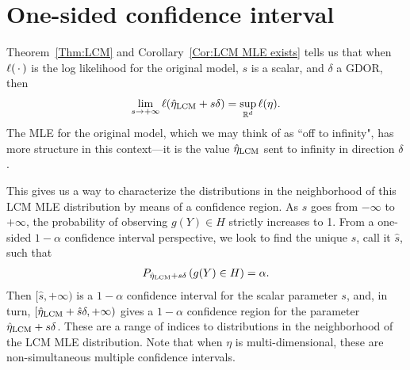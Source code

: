 \section{One-sided confidence interval} \label{S:CI}
Theorem~\ref{Thm:LCM} and Corollary~\ref{Cor:LCM MLE exists} 
tells us that when $\ell(\,\cdot\,)$ is the log likelihood for the original model,
$s$ is a scalar, and $\delta$ a GDOR, then
\begin{align*}
	\lim_{s \to +\infty} \ell(\hat{\eta}_{\textrm{LCM}} + s\delta) = \sup_{{\mathbb R}^d} \ell(\eta).
\end{align*}
The MLE for the original model, which we may think of as ``off to infinity", has
more structure in this context---it is the value $\hat{\eta}_{\textrm{LCM}}$ sent to 
infinity in direction $\delta$.

This gives us a way to characterize the distributions in the
neighborhood of this LCM MLE distribution by means of a confidence region.
As $s$ goes from $-\infty$ to $+\infty$, the probability of observing 
$g(Y) \in H$ strictly increases to 1.  
From a one-sided $1-\alpha$ confidence interval perspective, 
we look to find the unique $s$, 
call it $\hat{s}$, such that
\begin{align*}
	P_{\hat{\eta}_{\textrm{LCM}} + s\delta}\left (g(Y) \in H \right ) = \alpha.
\end{align*}
Then $[\hat{s}, +\infty)$ is a $1-\alpha$ confidence interval for the scalar parameter 
$s$, and, in turn, $[\hat{\eta}_{\textrm{LCM}} + \hat{s}\delta, +\infty)$ gives 
a $1-\alpha$ confidence region for the parameter $\hat{\eta}_{\textrm{LCM}} + s \delta$. 
These are a range of indices to distributions in the neighborhood of the LCM MLE
distribution.
Note that when $\eta$ is multi-dimensional, these are non-simultaneous 
multiple confidence intervals.


